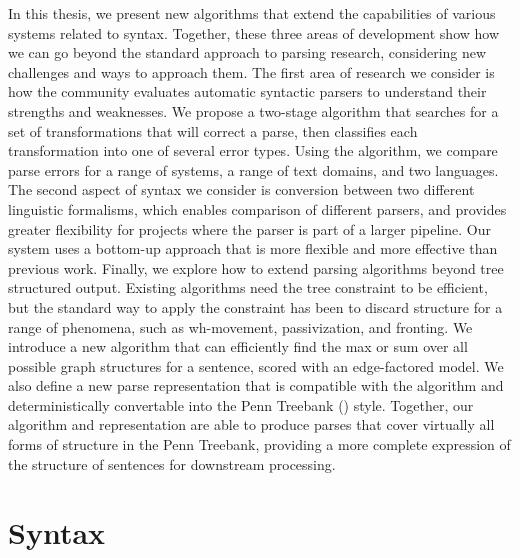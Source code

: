 In this thesis, we present new algorithms that extend the capabilities of various systems related to syntax.
Together, these three areas of development show how we can go beyond the standard approach to parsing research, considering new challenges and ways to approach them.
The first area of research we consider is how the community evaluates automatic syntactic parsers to understand their strengths and weaknesses.
We propose a two-stage algorithm that searches for a set of transformations that will correct a parse, then classifies each transformation into one of several error types.
Using the algorithm, we compare parse errors for a range of systems, a range of text domains, and two languages.
The second aspect of syntax we consider is conversion between two different linguistic formalisms, which enables comparison of different parsers, and provides greater flexibility for projects where the parser is part of a larger pipeline.
Our system uses a bottom-up approach that is more flexible and more effective than previous work.
Finally, we explore how to extend parsing algorithms beyond tree structured output.
Existing algorithms need the tree constraint to be efficient, but the standard way to apply the constraint has been to discard structure for a range of phenomena, such as wh-movement, passivization, and fronting.
We introduce a new algorithm that can efficiently find the max or sum over all possible graph structures for a sentence, scored with an edge-factored model.
We also define a new parse representation that is compatible with the algorithm and deterministically convertable into the Penn Treebank (\ptb) style.
Together, our algorithm and representation are able to produce parses that cover virtually all forms of structure in the Penn Treebank, providing a more complete expression of the structure of sentences for downstream processing.

\section{Syntax}
\label{sec:syntax}


